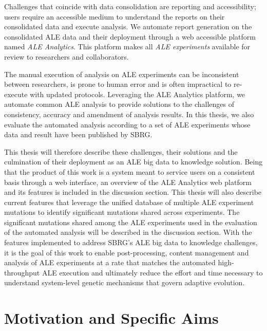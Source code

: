 \documentclass[12pt,final,masters,chapterheads]{ucsd}  %
\begin{document}
Challenges that coincide with data consolidation are reporting and accessibility; users require an accessible medium to understand the reports on their consolidated data and execute analysis. We automate report generation on the consolidated ALE data and their deployment through a web accessible platform named \textit{ALE Analytics}. This platform makes all \textit{ALE experiments} available for review to researchers and collaborators.

The manual execution of analysis on ALE experiments can be inconsistent between researchers, is prone to human error and is often impractical to re-execute with updated protocols. Leveraging the ALE Analytics platform, we automate common ALE analysis to provide solutions to the challenges of consistency, accuracy and amendment of analysis results. In this thesis, we also evaluate the automated analysis according to a set of ALE experiments whose data and result have been published by SBRG.

This thesis will therefore describe these challenges, their solutions and the culmination of their deployment as an ALE big data to knowledge solution. Being that the product of this work is a system meant to service users on a consistent basis through a web interface, an overview of the ALE Analytics web platform and its features is included in the discussion section. This thesis will also describe current features that leverage the unified database of multiple ALE experiment mutations to identify significant mutations shared across experiments. The significant mutations shared among the ALE experiments used in the evaluation of the automated analysis will be described in the discussion section. With the features implemented to address SBRG's ALE big data to knowledge challenges, it is the goal of this work to enable post-processing, content management and analysis of ALE experiments at a rate that matches the automated high-throughput ALE execution and ultimately reduce the effort and time necessary to understand system-level genetic mechanisms that govern adaptive evolution.
\chapter{Motivation and Specific Aims}
%
%
%
%
%
%
%
%
\end{document}
